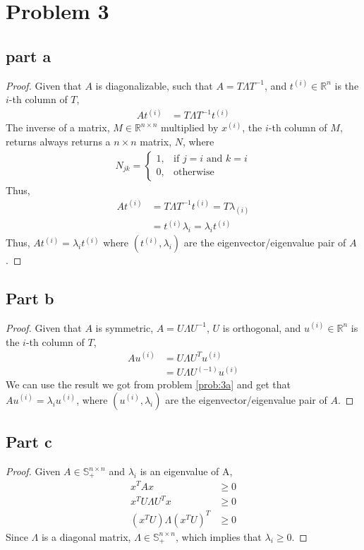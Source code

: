 \documentclass[11pt,a4paper,titlepage]{article}
\newcommand{\R}{\mathbb{R}}
\begin{document}
\section{Problem 3}{
\subsection{part a}{
\begin{proof}
Given that $A$ is diagonalizable, such that $A=T\Lambda T^{-1}$, and $t^{(i)}\in\R^n$ is the $i$-th column of $T$,
\begin{align*}
	At^{(i)}&=T\Lambda T^{-1}t^{(i)}
\end{align*}
The inverse of a matrix, $M\in\R^{n \times n}$ multiplied by $x^{(i)}$, the $i$-th column of $M$, returns always returns a $n\times n$ matrix, $N$, where
\begin{align*}
	N_{jk} = 
    \begin{cases}
    	1, & \text{if } j=i \text{ and } k=i\\
        0, & \text{otherwise}
    \end{cases}
\end{align*}
Thus, 
\begin{align*}
	At^{(i)}&=T\Lambda T^{-1}t^{(i)}=T\lambda_{(i)}
	\\&=t^{(i)}\lambda_i=\lambda_it^{(i)}
\end{align*}
Thus, $At^{(i)}=\lambda_it^{(i)}$ where $(t^{(i)}, \lambda_i)$ are the eigenvector/eigenvalue pair of $A$. 
\end{proof}
}\label{prob:3a}
\subsection{Part b}{
\begin{proof}
Given that $A$ is symmetric, $A=U\Lambda U^{-1}$, $U$ is orthogonal, and $u^{(i)}\in\R^n$ is the $i$-th column of $T$,
\begin{align*}
	Au^{(i)}&=U\Lambda U^Tu^{(i)}
    \\&=U\Lambda U^{(-1)}u^{(i)}
\end{align*}
We can use the result we got from problem \ref{prob:3a} and get that $Au^{(i)}=\lambda_iu^{(i)}$, where $(u^{(i)}, \lambda_i)$ are the eigenvector/eigenvalue pair of $A$.
\end{proof}
}\label{prob:3b}
\subsection{Part c}{
\begin{proof}
Given $A\in\mathbb{S}^{n \times n}_+$ and $\lambda_i$ is an eigenvalue of A,
\begin{align*}
	x^TAx&\geq0
  \\x^TU\Lambda U^Tx&\geq0
  \\(x^TU)\Lambda (x^TU)^T&\geq0
\end{align*}
Since $\Lambda$ is a diagonal matrix, $\Lambda\in\mathbb{S}^{n \times n}_+$, which implies that $\lambda_i\geq0$. 
\end{proof}
}\label{prob:3c}
}\label{problem 3}
\end{document}
